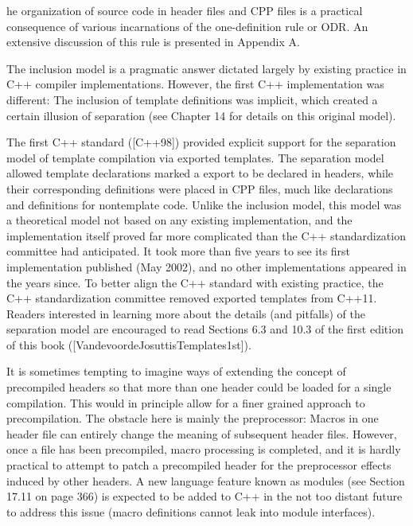 he organization of source code in header files and CPP files is a practical consequence of various incarnations of the one-definition rule or ODR. An extensive discussion of this rule is presented in Appendix A.

The inclusion model is a pragmatic answer dictated largely by existing practice in C++ compiler implementations. However, the first C++ implementation was different: The inclusion of template definitions was implicit, which created a certain illusion of separation (see Chapter 14 for details on this original model).

The first C++ standard ([C++98]) provided explicit support for the separation model of template compilation via exported templates. The separation model allowed template declarations marked a export to be declared in headers, while their corresponding definitions were placed in CPP files, much like declarations and definitions for nontemplate code. Unlike the inclusion model, this model was a theoretical model not based on any existing implementation, and the implementation itself proved far more complicated than the C++ standardization committee had anticipated. It took more than five years to see its first implementation published (May 2002), and no other implementations appeared in the years since. To better align the C++ standard with existing practice, the C++ standardization committee removed exported templates from C++11. Readers interested in learning more about the details (and pitfalls) of the separation model are encouraged to read Sections 6.3 and 10.3 of the first edition of this book ([VandevoordeJosuttisTemplates1st]).

It is sometimes tempting to imagine ways of extending the concept of precompiled headers so that more than one header could be loaded for a single compilation. This would in principle allow for a finer grained approach to precompilation. The obstacle here is mainly the preprocessor: Macros in one header file can entirely change the meaning of subsequent header files. However, once a file has been precompiled, macro processing is completed, and it is hardly practical to attempt to patch a precompiled header for the preprocessor effects induced by other headers. A new language feature known as modules (see Section 17.11 on page 366) is expected to be added to C++ in the not too distant future to address this issue (macro definitions cannot leak into module interfaces).